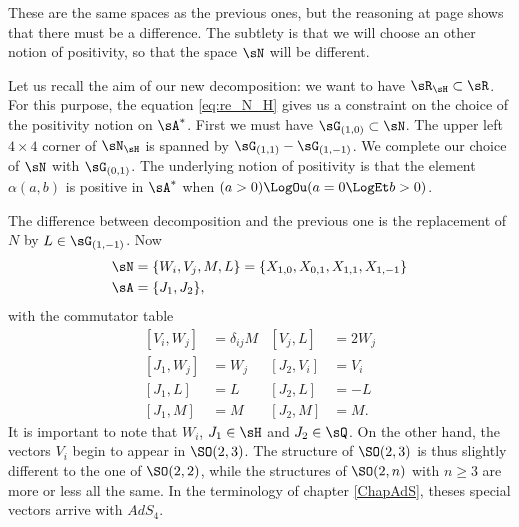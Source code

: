 These are the same spaces as the previous ones, but the reasoning at page \pageref{pg:subt_tilde} shows that there must be a difference. The subtlety is that we will choose an other notion of positivity, so that the space $\sN$ will be different. 


\newcommand{\CaptionFigHNxitLj}{The root space}

 
Let us recall the aim of our new decomposition: we want to have $\sR_{\sH}\subset\sR$. For this purpose, the equation \eqref{eq:re_N_H} gives us a constraint on the choice of the positivity notion on $\sA^*$. First we must have $\sG_{(1,0)}\subset\sN$. The upper left $4\times 4$ corner of $\sN_{\sH}$ is spanned by $\sG_{(1,1)}-\sG_{(1,-1)}$. We complete our choice of $\sN$ with $\sG_{(0,1)}$. The underlying notion of positivity is that the element $\alpha(a,b)$ is positive in $\sA^*$ when $ (a>0) \LogOu(a=0 \LogEt b>0)$. 

The difference between decomposition and the previous one is the replacement of $N$ by $L\in\sG_{(1,-1)}$. Now\label{PgTablaIwa}
\begin{subequations}		\label{EqLeANEnDimAlg}
\begin{align}
	\sN&=\{W_i,V_j,M,L\}=\{ X_{1,0},X_{0,1},X_{1,1},X_{1,-1} \}\\
\sA&=\{ J_1, J_2\},
\end{align}
\end{subequations}
with the commutator table 
\begin{subequations}  \label{EqTableSOIwa}
\begin{align}
[V_i,W_j]&=\delta_{ij}M &[V_j,L]&=2W_j\\
[ J_1,W_j]&=W_j       &[ J_2,V_i]&=V_i\\
[ J_1,L]&=L           &[ J_2,L]&=-L\\
[ J_1,M]&=M           &[ J_2,M]&=M.
\end{align}
\end{subequations}
It is important to note that $W_{i}$, $J_{1}\in\sH$ and $J_{2}\in\sQ$. On the other hand, the vectors $V_i$ begin to appear in $\SO(2,3)$. The structure of $\SO(2,3)$ is thus slightly different to the one of $\SO(2,2)$, while the structures of $\SO(2,n)$ with $n\geq 3$ are more or less all the same. In the terminology of chapter \ref{ChapAdS}, theses special vectors arrive with $AdS_4$.

